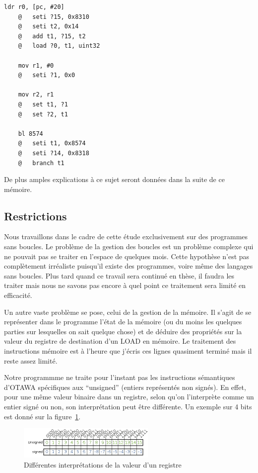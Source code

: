 \documentclass[french]{article}
\begin{document}
  \begin{lstlisting}[language={[ARM]Assembler}]
    ldr r0, [pc, #20]
    @	seti ?15, 0x8310
    @	seti t2, 0x14
    @	add t1, ?15, t2
    @	load ?0, t1, uint32

    mov r1, #0
    @	seti ?1, 0x0

    mov r2, r1
    @	set t1, ?1
    @	set ?2, t1

    bl 8574
    @	seti t1, 0x8574
    @	seti ?14, 0x8318
    @	branch t1
  \end{lstlisting}

  De plus amples explications à ce sujet seront données dans la suite de ce mémoire.

  \subsection{Restrictions}
  Nous travaillons dans le cadre de cette étude exclusivement sur des programmes sans boucles. Le problème de la gestion des boucles est un problème complexe qui ne pouvait pas se traiter en l'espace de quelques mois. Cette hypothèse n'est pas complètement irréaliste puisqu'il existe des programmes, voire même des langages sans boucles. Plus tard quand ce travail sera continué en thèse, il faudra les traiter mais nous ne savons pas encore à quel point ce traitement sera limité en efficacité.

  Un autre vaste problème se pose, celui de la gestion de la mémoire. Il s'agit de se représenter dans le programme l'état de la mémoire (ou du moins les quelques parties sur lesquelles on sait quelque chose) et de déduire des propriétés sur la valeur du registre de destination d'un LOAD en mémoire. Le traitement des instructions mémoire est à l'heure que j'écris ces lignes quasiment terminé mais il reste assez limité.

  Notre programmme ne traite pour l'instant pas les instructions sémantiques d'OTAWA spécifiques aux ``unsigned'' (entiers représentés non signés). En effet, pour une même valeur binaire dans un registre, selon qu'on l'interprète comme un entier signé ou non, son interprétation peut être différente. Un exemple sur 4 bits est donné sur la figure~\ref{representation_signed_unsigned}.

  \begin{figure}
    \centering
    \includegraphics[width=250px]{pictures/representation_signed_unsigned.png}
    \caption{Différentes interprétations de la valeur d'un registre}
    \label{representation_signed_unsigned}
  \end{figure}
\end{document}
